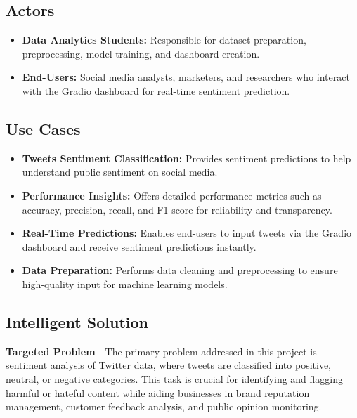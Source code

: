 \documentclass[journal]{IEEEtran}
\begin{document}
\subsection*{Actors}
\begin{itemize}
    \item \textbf{Data Analytics Students:} Responsible for dataset preparation, preprocessing, model training, and dashboard creation.
    \item \textbf{End-Users:} Social media analysts, marketers, and researchers who interact with the Gradio dashboard for real-time sentiment prediction.
\end{itemize}

\subsection*{Use Cases}
\begin{itemize}
    \item \textbf{Tweets Sentiment Classification:} Provides sentiment predictions to help understand public sentiment on social media.
    \item \textbf{Performance Insights:} Offers detailed performance metrics such as accuracy, precision, recall, and F1-score for reliability and transparency.
    \item \textbf{Real-Time Predictions:} Enables end-users to input tweets via the Gradio dashboard and receive sentiment predictions instantly.
    \item \textbf{Data Preparation:} Performs data cleaning and preprocessing to ensure high-quality input for machine learning models.
\end{itemize}


\subsection{\textbf{Intelligent Solution}}
\textbf{Targeted Problem} - The primary problem addressed in this project is sentiment analysis of Twitter data, where tweets are classified into positive, neutral, or negative categories. This task is crucial for identifying and flagging harmful or hateful content while aiding businesses in brand reputation management, customer feedback analysis, and public opinion monitoring.
\end{document}
